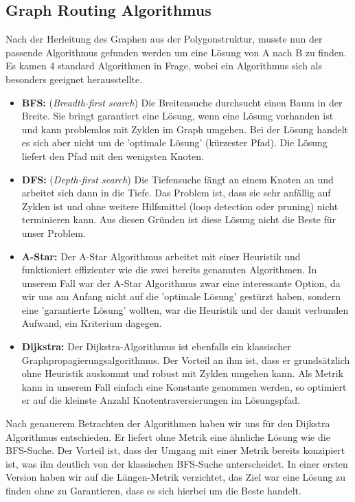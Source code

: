 \subsection{Graph Routing Algorithmus}
Nach der Herleitung des Graphen aus der Polygonstruktur, musste nun der passende Algorithmus gefunden werden um eine Lösung von A nach B zu finden. Es kamen 4 standard Algorithmen in Frage, wobei ein Algorithmus sich als besonders geeignet herausstellte.
\begin{itemize}
	\item{\textbf{BFS:} (\textit{Breadth-first search}) Die Breitensuche durchsucht einen Baum in der Breite. Sie bringt garantiert eine Lösung, wenn eine Lösung vorhanden ist und kann problemlos mit Zyklen im Graph umgehen. Bei der Lösung handelt es sich aber nicht um de 'optimale Lösung' (kürzester Pfad). Die Lösung liefert den Pfad mit den wenigsten Knoten. \cite{AiClass}}
	\item{\textbf{DFS:} (\textit{Depth-first search}) Die Tiefensuche fängt an einem Knoten an und arbeitet sich dann in die Tiefe. Das Problem ist, dass sie sehr anfällig auf Zyklen ist und ohne weitere Hilfsmittel (loop detection oder pruning) nicht terminieren kann. Aus diesen Gründen ist diese Lösung nicht die Beste für unser Problem. \cite{AiClass}}
	\item{\textbf{A-Star:} Der A-Star Algorithmus arbeitet mit einer Heuristik und funktioniert effizienter wie die zwei bereits genannten Algorithmen. In unserem Fall war der A-Star Algorithmus zwar eine interessante Option, da wir uns am Anfang nicht auf die 'optimale Lösung' gestürzt haben, sondern eine 'garantierte Lösung' wollten, war die Heuristik und der damit verbunden Aufwand, ein Kriterium dagegen. \cite{AiClass}}
	\item{\textbf{Dijkstra:} Der Dijkstra-Algorithmus ist ebenfalls ein klassischer Graphpropagierungsalgorithmus. Der Vorteil an ihm ist, dass er grundsätzlich ohne Heuristik auskommt und robust mit Zyklen umgehen kann. Als Metrik kann in unserem Fall einfach eine Konstante genommen werden, so optimiert er auf die kleinste Anzahl Knotentraversierungen im Lösungspfad.}
\end{itemize}
Nach genauerem Betrachten der Algorithmen haben wir uns für den Dijkstra Algorithmus entschieden. Er liefert ohne Metrik eine ähnliche Lösung wie die BFS-Suche. Der Vorteil ist, dass der Umgang mit einer Metrik bereits konzipiert ist, was ihn deutlich von der klassischen BFS-Suche unterscheidet.
In einer ersten Version haben wir auf die Längen-Metrik verzichtet, das Ziel war eine Lösung zu finden ohne zu Garantieren, dass es sich hierbei um die Beste handelt.
